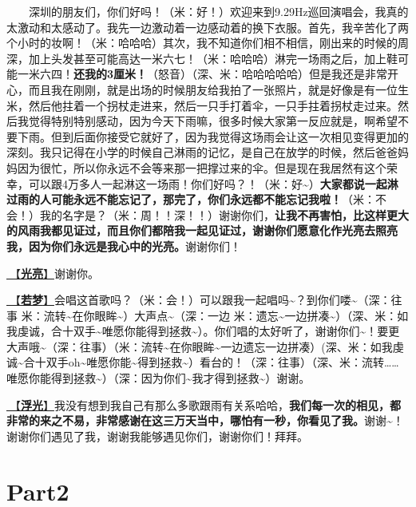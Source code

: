 \documentclass[]{ctexbook}
\begin{document}
  深圳的朋友们，你们好吗！（米：好！）欢迎来到9.29Hz巡回演唱会，我真的太激动和太感动了。我先一边激动着一边感动着的换下衣服。首先，我辛苦化了两个小时的妆啊！（米：哈哈哈）其次，我不知道你们相不相信，刚出来的时候的周深，加上头发甚至可能高达一米六七！（米：哈哈哈）淋完一场雨之后，加上鞋可能一米六四！\textbf{还我的3厘米！}（怒音）（深、米：哈哈哈哈哈）但是我还是非常开心，而且我在刚刚，就是出场的时候朋友给我拍了一张照片，就是好像是有一位生米，然后他拄着一个拐杖走进来，然后一只手打着伞，一只手拄着拐杖走过来。然后我觉得特别特别感动，因为今天下雨嘛，很多时候大家第一反应就是，啊希望不要下雨。但到后面你接受它就好了，因为我觉得这场雨会让这一次相见变得更加的深刻。我只记得在小学的时候自己淋雨的记忆，是自己在放学的时候，然后爸爸妈妈因为很忙，所以你永远不会等来那一把撑过来的伞。但是现在我居然有这个荣幸，可以跟4万多人一起淋这一场雨！你们好吗？！（米：好\textasciitilde）\textbf{大家都说一起淋过雨的人可能永远不能忘记了，那完了，你们永远都不能忘记我啦！}（米：不会！）我的名字是？（米：周！！深！！）谢谢你们，\textbf{让我不再害怕，比这样更大的风雨我都见证过，而且你们都陪我一起见证过，谢谢你们愿意化作光亮去照亮我，因为你们永远是我心中的光亮。}谢谢你们！

\hyperref[silver-linings]{🎵【\textbf{光亮}】}谢谢你。

\hyperref[ruomeng]{🎵【\textbf{若梦}】}会唱这首歌吗？（米：会！）可以跟我一起唱吗\textasciitilde？到你们喽\textasciitilde（深：往事 米：流转\textasciitilde 在你眼眸\textasciitilde）大声点\textasciitilde（深：一边 米：遗忘\textasciitilde 一边拼凑\textasciitilde）（深、米：如我虔诚，合十双手\textasciitilde 唯愿你能得到拯救\textasciitilde）。你们唱的太好听了，谢谢你们\textasciitilde！要更大声哦\textasciitilde（深：往事）（米：流转\textasciitilde 在你眼眸\textasciitilde 一边遗忘一边拼凑）(深、米：如我虔诚\textasciitilde 合十双手oh\textasciitilde 唯愿你能\textasciitilde 得到拯救\textasciitilde）看台的！（深：往事）（深、米：流转\ldots\ldots 唯愿你能得到拯救\textasciitilde）（深：因为你们\textasciitilde 我才得到拯救\textasciitilde）谢谢。

\hyperref[floating-light]{🎵【\textbf{浮光}】}我没有想到我自己有那么多歌跟雨有关系哈哈，\textbf{我们每一次的相见，都非常的来之不易，非常感谢在这三万天当中，哪怕有一秒，你看见了我。}谢谢\textasciitilde！谢谢你们遇见了我，谢谢我能够遇见你们，谢谢你们！拜拜。

\section{Part2}\label{shenzhen-20240601-part2}
\end{document}
